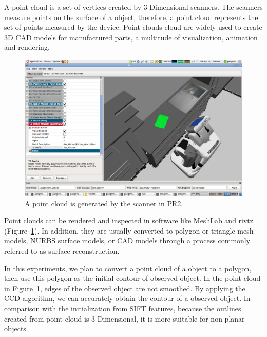 A point cloud is a set of vertices created by 3-Dimensional
scanners. The scanners measure points on the surface of a object,
therefore, a point cloud represents the set of points measured by the
device. Point clouds cloud are widely used to  create 3D CAD models
for manufactured parts, a multitude of visualization, animation and
rendering.
\begin{figure}[htb]
  \centering
  \includegraphics[width=\linewidth]{images/pr2b.png}
  \caption[Point cloud of a book rendered in rivz]{A point cloud is
    generated by the scanner in PR2.}
  \label{fig:pointcloud}
\end{figure}

Point clouds can be rendered and inspected in software like MeshLab
and rivtz (Figure~\ref{fig:pointcloud}). In addition, they are usually converted to polygon or
triangle mesh models, NURBS surface models, or CAD models through a
process commonly referred to as surface reconstruction.

In this experiments, we plan to convert a point cloud of a object to a
polygon, then use this polygon as the initial contour of observed
object. In the point cloud in Figure~\ref{fig:pointcloud}, edges of
the observed object are not smoothed. By applying the CCD algorithm,
we can accurately obtain the contour of a observed object. In
comparison with the initialization from SIFT features, because the
outlines created from point cloud is 3-Dimensional, it is more
suitable for non-planar objects.
